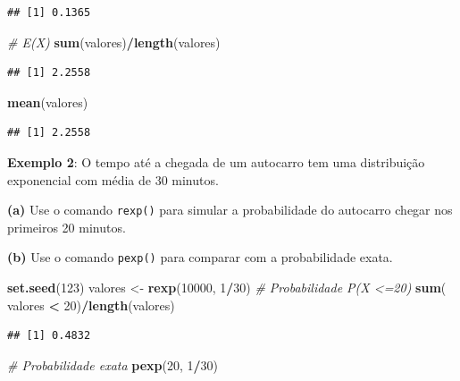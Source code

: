 \documentclass[
]{book}
\newenvironment{Shaded}{\begin{snugshade}}{\end{snugshade}}
\newcommand{\CommentTok}[1]{\textcolor[rgb]{0.56,0.35,0.01}{\textit{#1}}}
\newcommand{\DecValTok}[1]{\textcolor[rgb]{0.00,0.00,0.81}{#1}}
\newcommand{\FunctionTok}[1]{\textcolor[rgb]{0.13,0.29,0.53}{\textbf{#1}}}
\newcommand{\NormalTok}[1]{#1}
\newcommand{\OtherTok}[1]{\textcolor[rgb]{0.56,0.35,0.01}{#1}}
\newcommand{\SpecialCharTok}[1]{\textcolor[rgb]{0.81,0.36,0.00}{\textbf{#1}}}
\begin{document}
\begin{verbatim}
## [1] 0.1365
\end{verbatim}

\begin{Shaded}
\begin{Highlighting}[]
\CommentTok{\# E(X)}
\FunctionTok{sum}\NormalTok{(valores)}\SpecialCharTok{/}\FunctionTok{length}\NormalTok{(valores)}
\end{Highlighting}
\end{Shaded}

\begin{verbatim}
## [1] 2.2558
\end{verbatim}

\begin{Shaded}
\begin{Highlighting}[]
\FunctionTok{mean}\NormalTok{(valores)}
\end{Highlighting}
\end{Shaded}

\begin{verbatim}
## [1] 2.2558
\end{verbatim}

\textbf{Exemplo 2}: O tempo até a chegada de um autocarro tem uma
distribuição exponencial com média de 30 minutos.

\textbf{(a)} Use o comando \texttt{rexp()} para simular a probabilidade do autocarro
chegar nos primeiros 20 minutos.

\textbf{(b)} Use o comando \texttt{pexp()} para comparar com a probabilidade exata.

\begin{Shaded}
\begin{Highlighting}[]
\FunctionTok{set.seed}\NormalTok{(}\DecValTok{123}\NormalTok{)}
\NormalTok{valores }\OtherTok{\textless{}{-}} \FunctionTok{rexp}\NormalTok{(}\DecValTok{10000}\NormalTok{, }\DecValTok{1}\SpecialCharTok{/}\DecValTok{30}\NormalTok{)}
\CommentTok{\# Probabilidade P(X \textless{}=20)}
\FunctionTok{sum}\NormalTok{( valores }\SpecialCharTok{\textless{}} \DecValTok{20}\NormalTok{)}\SpecialCharTok{/}\FunctionTok{length}\NormalTok{(valores)}
\end{Highlighting}
\end{Shaded}

\begin{verbatim}
## [1] 0.4832
\end{verbatim}

\begin{Shaded}
\begin{Highlighting}[]
\CommentTok{\# Probabilidade exata}
\FunctionTok{pexp}\NormalTok{(}\DecValTok{20}\NormalTok{, }\DecValTok{1}\SpecialCharTok{/}\DecValTok{30}\NormalTok{)}
\end{Highlighting}
\end{Shaded}
\end{document}
